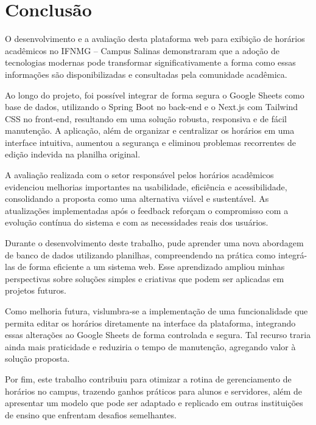 \chapter{Conclusão} 
\label{cap6_conclusao} 

O desenvolvimento e a avaliação desta plataforma web para exibição de horários acadêmicos no IFNMG – Campus Salinas demonstraram que a adoção de tecnologias modernas pode transformar significativamente a forma como essas informações são disponibilizadas e consultadas pela comunidade acadêmica.

Ao longo do projeto, foi possível integrar de forma segura o Google Sheets como base de dados, utilizando o Spring Boot no back-end e o Next.js com Tailwind CSS no front-end, resultando em uma solução robusta, responsiva e de fácil manutenção. A aplicação, além de organizar e centralizar os horários em uma interface intuitiva, aumentou a segurança e eliminou problemas recorrentes de edição indevida na planilha original.

A avaliação realizada com o setor responsável pelos horários acadêmicos evidenciou melhorias importantes na usabilidade, eficiência e acessibilidade, consolidando a proposta como uma alternativa viável e sustentável. As atualizações implementadas após o feedback reforçam o compromisso com a evolução contínua do sistema e com as necessidades reais dos usuários.

Durante o desenvolvimento deste trabalho, pude aprender uma nova abordagem de banco de dados utilizando planilhas, compreendendo na prática como integrá-las de forma eficiente a um sistema web. Esse aprendizado ampliou minhas perspectivas sobre soluções simples e criativas que podem ser aplicadas em projetos futuros.

Como melhoria futura, vislumbra-se a implementação de uma funcionalidade que permita editar os horários diretamente na interface da plataforma, integrando essas alterações ao Google Sheets de forma controlada e segura. Tal recurso traria ainda mais praticidade e reduziria o tempo de manutenção, agregando valor à solução proposta.

Por fim, este trabalho contribuiu para otimizar a rotina de gerenciamento de horários no campus, trazendo ganhos práticos para alunos e servidores, além de apresentar um modelo que pode ser adaptado e replicado em outras instituições de ensino que enfrentam desafios semelhantes.
